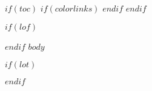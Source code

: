 
$if(toc)$
{
$if(colorlinks)$
\hypersetup{linkcolor=$if(toccolor)$$toccolor$$else$black$endif$}
$endif$
\setcounter{tocdepth}{1}
\tableofcontents
}
$endif$

\newpage

$if(lof)$
\listoffigures
$endif$
$body$

\newpage

$if(lot)$
\listoftables
$endif$
